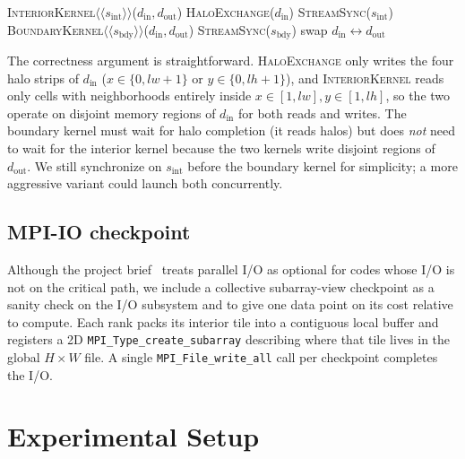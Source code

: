 \documentclass[sigconf,nonacm,10pt]{acmart}
\begin{document}
\begin{algorithm}[t]
\caption{Driver loop with comm/comp overlap (one timestep).}
\label{alg:overlap}
\begin{algorithmic}[1]
\State \textsc{InteriorKernel}$\langle\langle s_{\text{int}}\rangle\rangle$($d_{\text{in}}, d_{\text{out}}$)
\State \textsc{HaloExchange}($d_{\text{in}}$) 
\State \textsc{StreamSync}($s_{\text{int}}$) 
\State \textsc{BoundaryKernel}$\langle\langle s_{\text{bdy}}\rangle\rangle$($d_{\text{in}}, d_{\text{out}}$)
\State \textsc{StreamSync}($s_{\text{bdy}}$)
\State swap $d_{\text{in}} \leftrightarrow d_{\text{out}}$
\end{algorithmic}
\end{algorithm}

The correctness argument is straightforward.
\textsc{HaloExchange} only writes the four halo strips of $d_{\text{in}}$
($x\in\{0,\mathit{lw}+1\}$ or $y\in\{0,\mathit{lh}+1\}$), and
\textsc{InteriorKernel} reads only cells with neighborhoods entirely
inside $x\in[1,\mathit{lw}], y\in[1,\mathit{lh}]$, so the two operate
on disjoint memory regions of $d_{\text{in}}$ for both reads and
writes. The boundary kernel must wait for halo completion (it reads
halos) but does \emph{not} need to wait for the interior kernel because
the two kernels write disjoint regions of $d_{\text{out}}$. We still
synchronize on $s_{\text{int}}$ before the boundary kernel for
simplicity; a more aggressive variant could launch both concurrently.

\subsection{MPI-IO checkpoint}

Although the project brief~\cite{aimosdocs} treats parallel I/O as
optional for codes whose I/O is not on the critical path, we include a
collective subarray-view checkpoint as a sanity check on the I/O
subsystem and to give one data point on its cost relative to compute.
Each rank packs its interior tile into a contiguous local buffer and
registers a 2D \texttt{MPI\_Type\_create\_subarray} describing where
that tile lives in the global $H\times W$ file. A single
\texttt{MPI\_File\_write\_all} call per checkpoint completes the I/O.

\section{Experimental Setup}\label{sec:exp}
\end{document}
